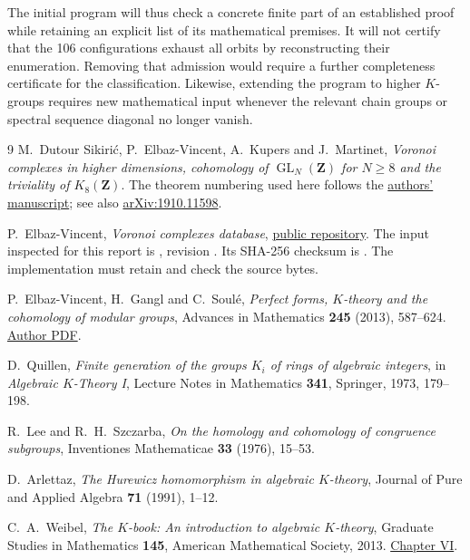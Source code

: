 \documentclass[11pt,a4paper]{article}
\numberwithin{equation}{section}
\theoremstyle{definition}
\theoremstyle{remark}
\newcommand{\Z}{\mathbf Z}
\newcommand{\GL}{\operatorname{GL}}
\begin{document}
The initial program will thus check a concrete finite part of an
established proof while retaining an explicit list of its mathematical
premises. It will not certify that the 106 configurations exhaust all
orbits by reconstructing their enumeration. Removing that admission
would require a further completeness certificate for the classification.
Likewise, extending the program to higher \(K\)-groups requires new
mathematical input whenever the relevant chain groups or spectral
sequence diagonal no longer vanish.

\clearpage
\begin{thebibliography}{9}\small
{}
M.~Dutour Sikirić, P.~Elbaz-Vincent, A.~Kupers and J.~Martinet,
\emph{Voronoi complexes in higher dimensions, cohomology of
\(\GL_N(\Z)\) for \(N\geq8\) and the triviality of \(K_8(\Z)\)}.
The theorem numbering used here follows the
\href{https://jamartin.perso.math.cnrs.fr/Publications/DEKM.pdf}{authors' manuscript};
see also \href{https://arxiv.org/abs/1910.11598}{arXiv:1910.11598}.

P.~Elbaz-Vincent, \emph{Voronoi complexes database},
\href{https://github.com/elbazvip/Voronoi-complexes-database}{public repository}.
The input inspected for this report is
, revision
.
Its SHA-256 checksum is
.
The implementation must retain and check the source bytes.

P.~Elbaz-Vincent, H.~Gangl and C.~Soulé,
\emph{Perfect forms, \(K\)-theory and the cohomology of modular groups},
Advances in Mathematics \textbf{245} (2013), 587--624.
\href{https://www.ihes.fr/~soule/documents/YAIMA4438.pdf}{Author PDF}.

D.~Quillen,
\emph{Finite generation of the groups \(K_i\) of rings of algebraic integers},
in \emph{Algebraic \(K\)-Theory I}, Lecture Notes in Mathematics
\textbf{341}, Springer, 1973, 179--198.

R.~Lee and R.~H.~Szczarba,
\emph{On the homology and cohomology of congruence subgroups},
Inventiones Mathematicae \textbf{33} (1976), 15--53.

D.~Arlettaz,
\emph{The Hurewicz homomorphism in algebraic \(K\)-theory},
Journal of Pure and Applied Algebra \textbf{71} (1991), 1--12.

C.~A.~Weibel, \emph{The \(K\)-book: An introduction to algebraic
\(K\)-theory}, Graduate Studies in Mathematics \textbf{145},
American Mathematical Society, 2013.
\href{https://sites.math.rutgers.edu/~weibel/Kbook/Kbook.VI.pdf}{Chapter VI}.
\end{thebibliography}
\end{document}
